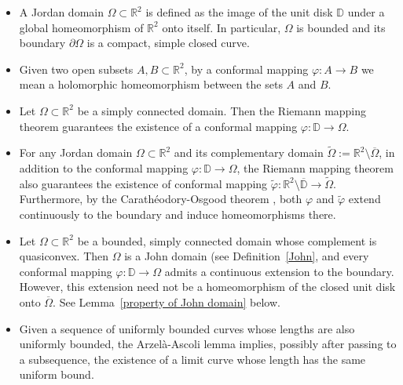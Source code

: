 \documentclass[reqno,11pt]{amsart}
\def\wz{\widetilde}
\numberwithin{equation}{section}
\theoremstyle{remark}
\begin{document}
\begin{itemize}
    \item A Jordan domain $\Omega \subset \mathbb{R}^2$ is defined as the image of the unit disk $\mathbb{D}$ under a global homeomorphism of $\mathbb{R}^2$ onto itself. In particular, $\Omega$ is bounded and its boundary $\partial \Omega$ is a compact, simple closed curve. 

    \item Given two open subsets $A,B \subset \mathbb R^2$, by a conformal mapping $\varphi \colon A \to B$  we mean a holomorphic homeomorphism between the sets $A$ and $B$.

    \item Let $\Omega \subset \mathbb R^2$ be a simply connected domain. Then the Riemann mapping theorem guarantees the existence of a conformal mapping $\varphi \colon \mathbb{D} \to \Omega$.

    \item For any Jordan domain $\Omega \subset \mathbb{R}^2$ and its complementary domain $\wz{\Omega}:=\mathbb R^2\setminus \overline{\Omega}$, in addition to the conformal mapping $\varphi \colon \mathbb{D} \to \Omega$, the Riemann mapping theorem also guarantees the existence of conformal mapping $\wz{\varphi} \colon \mathbb{R}^2 \setminus \overline{\mathbb{D}} \to \wz{\Omega}$. Furthermore, by the Carath\'eodory-Osgood theorem \cite[Section IX.4]{P1991}, both $\varphi$ and $\wz{\varphi}$ extend continuously to the boundary and induce homeomorphisms there.

    \item Let $\Omega \subset \mathbb{R}^2$ be a bounded, simply connected domain whose complement is quasiconvex. Then $\Omega$ is a John domain (see Definition~\ref{John}, and every conformal mapping $\varphi \colon \mathbb{D} \to \Omega$ admits a continuous extension to the boundary. However, this extension need not be a homeomorphism of the closed unit disk onto $\overline{\Omega}$. See Lemma~\ref{property of John domain} below. 

    \item Given a sequence of uniformly bounded curves whose lengths are also uniformly bounded, the Arzel\`a-Ascoli lemma \cite[Theorem 2.5.14]{BBI2001} implies, possibly after passing to a subsequence, the existence of a limit curve whose length has the same uniform bound.
\end{itemize}
 

\medskip
 
\end{document}
